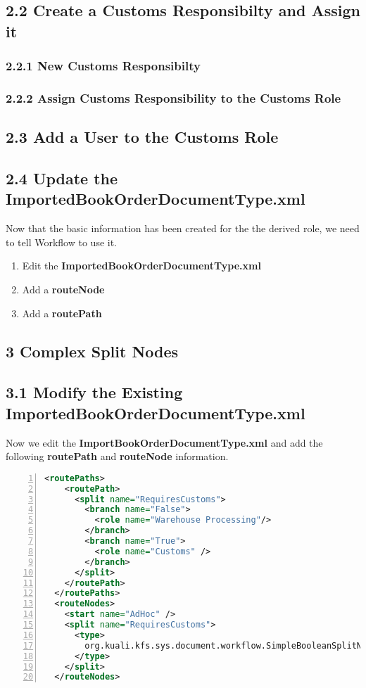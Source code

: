 \subsection*{2.2 Create a Customs Responsibilty and Assign it}

\subsubsection*{2.2.1 New Customs Responsibilty}

\subsubsection*{2.2.2 Assign Customs Responsibility to the Customs Role}

\subsection*{2.3 Add a User to the Customs Role}

\subsection*{2.4 Update the ImportedBookOrderDocumentType.xml}
Now that the basic information has been created for the the derived
role, we need to tell Workflow to use it.

\begin{enumerate}
  \item Edit the \textbf{ImportedBookOrderDocumentType.xml}
  \item Add a \textbf{routeNode}
  \item Add a \textbf{routePath}
\end{enumerate}


\subsection*{3 Complex Split Nodes}

\subsection*{3.1 Modify the Existing ImportedBookOrderDocumentType.xml}

Now we edit the \textbf{ImportBookOrderDocumentType.xml} and add the
following \textbf{routePath} and \textbf{routeNode} information.
\begin{lstlisting}[numbers=left,language=xml,basicstyle=\scriptsize,backgroundcolor=\color{ubergray},caption={ImportBookOrderDocumentType.xml},frame=single,breaklines=true]
 <routePaths>
    <routePath>
      <split name="RequiresCustoms">
        <branch name="False">
          <role name="Warehouse Processing"/>
        </branch>
        <branch name="True">
          <role name="Customs" />
        </branch>
      </split>
    </routePath>
  </routePaths>
  <routeNodes>
    <start name="AdHoc" />
    <split name="RequiresCustoms">
      <type>
        org.kuali.kfs.sys.document.workflow.SimpleBooleanSplitNode
      </type>
    </split>
  </routeNodes>
\end{lstlisting}

